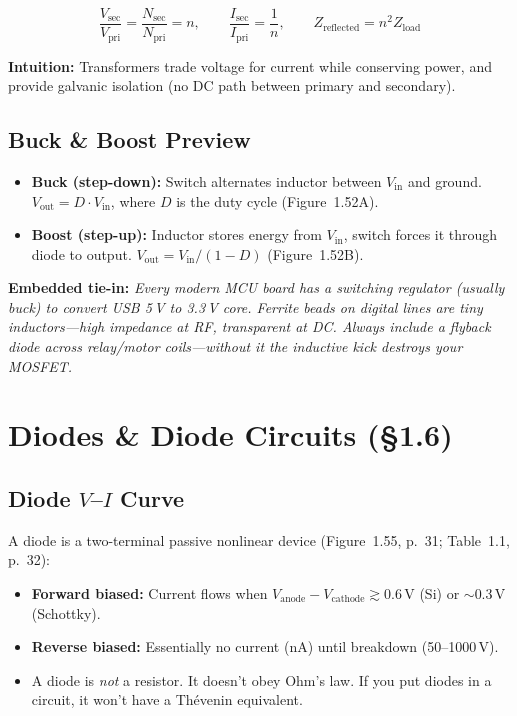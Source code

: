 \documentclass[11pt,a4paper]{article}
\newcommand{\intuition}[1]{\par\textcolor{intuition}{\textbf{Intuition:}} #1}
\newcommand{\embedded}[1]{\par\textcolor{embed}{\textbf{Embedded tie-in:}} \textit{#1}}
\begin{document}
\begin{equation}
\frac{V_{\text{sec}}}{V_{\text{pri}}} = \frac{N_{\text{sec}}}{N_{\text{pri}}} = n, \qquad
\frac{I_{\text{sec}}}{I_{\text{pri}}} = \frac{1}{n}, \qquad
Z_{\text{reflected}} = n^2 Z_{\text{load}}
\end{equation}

\intuition{Transformers trade voltage for current while conserving power, and provide galvanic isolation (no DC path between primary and secondary).}

\subsection{Buck \& Boost Preview}

\begin{itemize}[nosep]
\item \textbf{Buck (step-down):} Switch alternates inductor between $V_{\text{in}}$ and ground. $V_{\text{out}} = D \cdot V_{\text{in}}$, where $D$ is the duty cycle (Figure~1.52A).
\item \textbf{Boost (step-up):} Inductor stores energy from $V_{\text{in}}$, switch forces it through diode to output. $V_{\text{out}} = V_{\text{in}} / (1-D)$ (Figure~1.52B).
\end{itemize}

\embedded{Every modern MCU board has a switching regulator (usually buck) to convert USB 5\,V to 3.3\,V core. Ferrite beads on digital lines are tiny inductors---high impedance at RF, transparent at DC. Always include a flyback diode across relay/motor coils---without it the inductive kick destroys your MOSFET.}

\section{Diodes \& Diode Circuits (\S1.6)}

\subsection{Diode $V$--$I$ Curve}

A diode is a two-terminal passive nonlinear device (Figure~1.55, p.~31; Table~1.1, p.~32):

\begin{itemize}[nosep]
\item \textbf{Forward biased:} Current flows when $V_{\text{anode}} - V_{\text{cathode}} \gtrsim 0.6\,$V (Si) or $\sim$0.3\,V (Schottky).
\item \textbf{Reverse biased:} Essentially no current (nA) until breakdown (50--1000\,V).
\item A diode is \emph{not} a resistor. It doesn't obey Ohm's law. If you put diodes in a circuit, it won't have a Th\'{e}venin equivalent.
\end{itemize}
\end{document}

